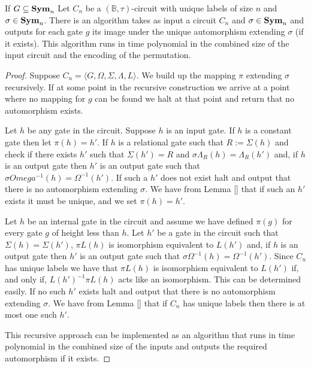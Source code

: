 \documentclass[../paper.tex]{subfiles}
\begin{document}
\begin{lem}
  If $G \subseteq \text{\textbf{Sym}}_n$
  Let $C_n$ be a $(\mathbb{B}, \tau)$-circuit with unique labels of size $n$ and
  $\sigma \in \text{\textbf{Sym}}_n$. There is an algorithm takes as input a circuit $C_n$ and
  $\sigma \in \text{\textbf{Sym}}_n$ and outputs for each gate $g$ its image under the unique
  automorphism extending $\sigma$ (if it exists). This algorithm runs in time
  polynomial in the combined size of the input circuit and the encoding of the
  permutation.
  \label{lem:compute-automorphisms}
\end{lem}
\begin{proof}
  Suppose $C_n = \langle G, \Omega, \Sigma, \Lambda, L \rangle$. We build up the
  mapping $\pi$ extending $\sigma$ recursively. If at some point in the
  recursive construction we arrive at a point where no mapping for $g$ can be
  found we halt at that point and return that no automorphism exists.

  Let $h$ be any gate in the circuit. Suppose $h$ is an input gate. If $h$ is a
  constant gate then let $\pi (h) = h'$. If $h$ is a relational gate such that
  $R := \Sigma(h)$ and check if there exists $h'$ such that $\Sigma (h') = R$
  and $\sigma \Lambda_R(h) = \Lambda_R(h')$ and, if $h$ is an output gate then
  $h'$ is an output gate such that $\sigma Omega^{-1}(h) = \Omega^{-1}(h')$. If
  such a $h'$ does not exist halt and output that there is no automorphism
  extending $\sigma$. We have from Lemma \ref{} that if such an $h'$ exists it
  must be unique, and we set $\pi(h) = h'$.

  Let $h$ be an internal gate in the circuit and assume we have defined $\pi
  (g)$ for every gate $g$ of height less than $h$. Let $h'$ be a gate in the
  circuit such that $\Sigma(h) = \Sigma (h')$, $\pi L(h)$ is isomorphism
  equivalent to $L(h')$ and, if $h$ is an output gate then $h'$ is an output
  gate such that $\sigma \Omega^{-1}(h) = \Omega^{-1}(h')$. Since $C_n$ has
  unique labels we have that $\pi L(h)$ is isomorphism equivalent to $L(h')$ if,
  and only if, $L(h')^{-1}\pi L(h)$ acts like an isomorphism. This can be
  determined easily. If no such $h'$ exists halt and output that there is no
  automorphism extending $\sigma$. We have from Lemma \ref{} that if $C_n$ has
  unique labels then there is at most one such $h'$.

  This recursive approach can be implemented as an algorithm that runs in time
  polynomial in the combined size of the inputs and outputs the required
  automorphism if it exists.
\end{proof}
\end{document}
